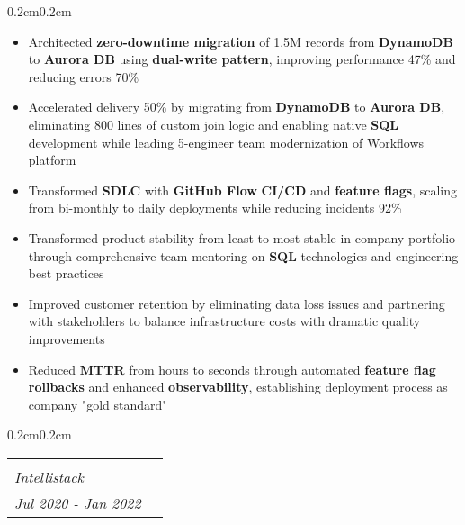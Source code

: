 \documentclass[10pt, letterpaper]{article}
\makeatletter
\newenvironment{highlights}{
    \begin{itemize}[
        topsep=0.10 cm,
        parsep=0.10 cm,
        partopsep=0pt,
        itemsep=0pt,
        leftmargin=0.4 cm + 10pt
    ]
}{
    \end{itemize}
}
\newenvironment{onecolentry}{
    \begin{adjustwidth}{0.2cm}{0.2cm}
}{
    \end{adjustwidth}
}
\newcommand{\jobentry}[4]{
    \begin{onecolentry}
        \noindent
        \begin{tabularx}{\textwidth}{@{}X>{\raggedleft\arraybackslash}p{3cm}@{\hspace{0.2cm}}}
            \begin{tabular}[t]{@{}l@{}}
                \textbf{#1}\\
                \textit{#2}
            \end{tabular} &
            \begin{tabular}[t]{@{}r@{}}
                #4\\
                \textit{#3}
            \end{tabular}
        \end{tabularx}
    \end{onecolentry}
}
\makeatother
\begin{document}
    \vspace{0.10cm}
    \begin{onecolentry}
        \begin{highlights}
            \item Architected \textbf{zero-downtime migration} of 1.5M records from \textbf{DynamoDB} to \textbf{Aurora DB} using \textbf{dual-write pattern}, improving performance 47\% and reducing errors 70\%
            \item Accelerated delivery 50\% by migrating from \textbf{DynamoDB} to \textbf{Aurora DB}, eliminating 800 lines of custom join logic and enabling native \textbf{SQL} development while leading 5-engineer team modernization of Workflows platform
            \item Transformed \textbf{SDLC} with \textbf{GitHub Flow} \textbf{CI/CD} and \textbf{feature flags}, scaling from bi-monthly to daily deployments while reducing incidents 92\%
            \item Transformed product stability from least to most stable in company portfolio through comprehensive team mentoring on \textbf{SQL} technologies and engineering best practices
            \item Improved customer retention by eliminating data loss issues and partnering with stakeholders to balance infrastructure costs with dramatic quality improvements
            \item Reduced \textbf{MTTR} from hours to seconds through automated \textbf{feature flag rollbacks} and enhanced \textbf{observability}, establishing deployment process as company "gold standard"
        \end{highlights}
    \end{onecolentry}
    
    \vspace{0.3cm}
    \jobentry{Senior Software Developer}{Intellistack}{Jul 2020 - Jan 2022}{Remote}
\end{document}

